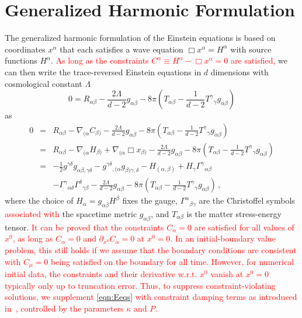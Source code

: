 \documentclass[a4paper,11pt]{article}
\numberwithin{equation}{section}
\begin{document}
\appendix
\setcounter{tocdepth}{1}
\section{Generalized Harmonic Formulation}
\label{sec:GHfor}

The generalized harmonic formulation of the Einstein equations is based on coordinates $x^\alpha$ that each satisfies a wave equation $\Box x^{\alpha}=H^\alpha$ with source functions $H^\alpha$.
\textcolor{red}{As long as the constraints $C^\alpha \equiv H^\alpha-\Box x^\alpha=0$ are satisfied,}
we can then write the trace-reversed Einstein equations in $d$ dimensions with cosmological constant $\Lambda$
\begin{equation}
0=R_{\alpha\beta} - \frac{2\Lambda}{d-2} g_{\alpha\beta} - 8\pi\left( T_{\alpha\beta} - \frac{1}{d-2} {T^\gamma}_\gamma g_{\alpha\beta} \right)
\end{equation}
as
\begin{eqnarray}
0
&=& R_{\alpha\beta} - \nabla_{(\alpha} C_{\beta)} - \frac{2\Lambda}{d-2} g_{\alpha\beta} - 8\pi\left( T_{\alpha\beta} - \frac{1}{d-2} {T^\gamma}_\gamma g_{\alpha\beta} \right) \nonumber \\
&=& R_{\alpha\beta} - \nabla_{(\alpha} H_{\beta)} + \nabla_{(\alpha} \Box{x}_{\beta)} - \frac{2\Lambda}{d-2} g_{\alpha\beta} - 8\pi\left( T_{\alpha\beta} - \frac{1}{d-2} {T^\gamma}_\gamma g_{\alpha\beta} \right) \nonumber \\
&=& -\frac{1}{2} g^{\gamma\delta} g_{\alpha\beta,\gamma\delta} - g^{\gamma\delta}{}_{,(\alpha}g_{\beta)\gamma,\delta} - H_{(\alpha,\beta)} + H_\gamma \Gamma^\gamma{}_{\alpha\beta} \nonumber \\
&&- \Gamma^\gamma{}_{\alpha\delta}\Gamma^\delta{}_{\gamma\beta} - \frac{2\Lambda}{d-2} g_{\alpha\beta} - 8\pi\left( T_{\alpha\beta} - \frac{1}{d-2} {T^\gamma}_\gamma g_{\alpha\beta}\right) \,, \label{eqn:Eeqs} 
\end{eqnarray}
where the choice of $H_\alpha = g_{\alpha\beta} H^\beta$ fixes the gauge, $\Gamma^\alpha{}_{\beta\gamma}$ are the Christoffel symbols \textcolor{red}{associated with}
the spacetime metric $g_{\alpha\beta}$, and $T_{\alpha\beta}$ is the matter stress-energy tensor. 
\textcolor{red}{It can be proved that the constraints $C_\alpha=0$ are satisfied for all values of $x^0$, as long as $C_\alpha=0$ and $\partial_{x^0}C_\alpha=0$ at $x^0=0$. In an initial-boundary value problem, this still holds if we assume that the boundary conditions are consistent with $C_\mu=0$ being satisfied on the boundary for all time.
However, for numerical initial data, the constraints and their derivative w.r.t. $x^0$ vanish at $x^0=0$ typically only up to truncation error. Thus, to suppress constraint-violating solutions, we supplement \eqref{eqn:Eeqs} with constraint damping terms as introduced in~\cite{Gundlach:2005eh}, controlled by the parameters $\kappa$ and $P$.}
\end{document}
